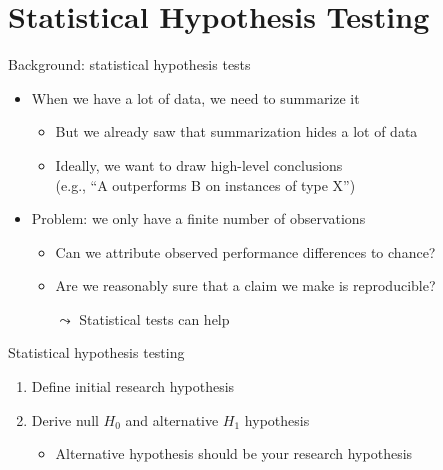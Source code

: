 \section{Statistical Hypothesis Testing}
\begin{frame}[c]{Background: statistical hypothesis tests}

\begin{itemize}
	\item When we have a lot of data, we need to summarize it
	\begin{itemize}
		\item But we already saw that summarization hides a lot of data
		\item Ideally, we want to draw high-level conclusions\\
		(e.g., ``A outperforms B on instances of type X'')
	\end{itemize}
	
	\pause
	\bigskip
	
	\item Problem: we only have a finite number of observations
	\begin{itemize}
		\item Can we attribute observed performance differences to chance?
		\item Are we reasonably sure that a claim we make is reproducible?
		\item[$\leadsto$] Statistical tests can help
	\end{itemize}
	
	
\end{itemize}

\medskip

\end{frame}
\begin{frame}[c]{Statistical hypothesis testing}

\begin{enumerate}
\item Define initial research hypothesis
\pause
\item Derive null $H_0$ and alternative $H_1$ hypothesis
\begin{itemize}
	\item Alternative hypothesis should be your research hypothesis
\end{itemize}
\pause
\end{enumerate}	

\end{frame}
